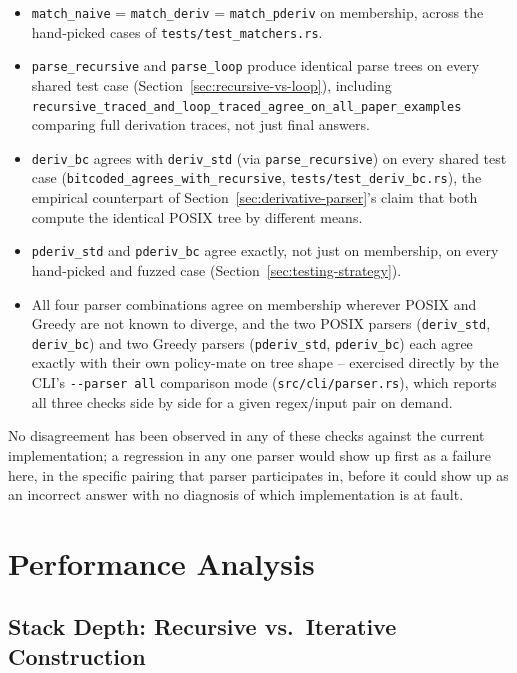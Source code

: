 \begin{itemize}
  \item \texttt{match\_naive} = \texttt{match\_deriv} = \texttt{match\_pderiv}
  on membership, across the hand-picked cases of
  \texttt{tests/test\_matchers.rs}.
  \item \texttt{parse\_recursive} and \texttt{parse\_loop} produce
  identical parse trees on every shared test case
  (Section~\ref{sec:recursive-vs-loop}), including
  \texttt{recursive\_traced\_and\_loop\_traced\_agree\_on\_all\_paper\_examples}
  comparing full derivation traces, not just final answers.
  \item \texttt{deriv\_bc} agrees with \texttt{deriv\_std} (via
  \texttt{parse\_recursive}) on every shared test case
  (\texttt{bitcoded\_agrees\_with\_recursive}, \texttt{tests/test\_deriv\_bc.rs}),
  the empirical counterpart of Section~\ref{sec:derivative-parser}'s
  claim that both compute the identical POSIX tree by different means.
  \item \texttt{pderiv\_std} and \texttt{pderiv\_bc} agree exactly, not
  just on membership, on every hand-picked and fuzzed case
  (Section~\ref{sec:testing-strategy}).
  \item All four parser combinations agree on membership wherever POSIX
  and Greedy are not known to diverge, and the two POSIX parsers
  (\texttt{deriv\_std}, \texttt{deriv\_bc}) and two Greedy parsers
  (\texttt{pderiv\_std}, \texttt{pderiv\_bc}) each agree exactly with
  their own policy-mate on tree shape -- exercised directly by the CLI's
  \texttt{-{}-parser all} comparison mode
  (\texttt{src/cli/parser.rs}), which reports all three checks
  side by side for a given regex/input pair on demand.
\end{itemize}

No disagreement has been observed in any of these checks against the
current implementation; a regression in any one parser would show up
first as a failure here, in the specific pairing that parser
participates in, before it could show up as an incorrect answer with no
diagnosis of which implementation is at fault.



\section{Performance Analysis}
\label{sec:performance-analysis}

\subsection{Stack Depth: Recursive vs.\ Iterative Construction}
\label{sec:stack-depth}

